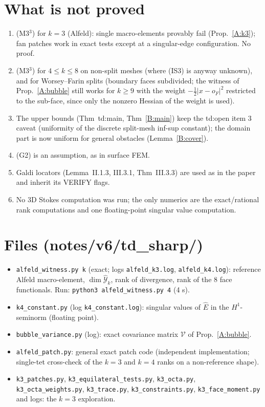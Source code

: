 \documentclass[11pt]{article}
\theoremstyle{definition}
\begin{document}
\section{What is not proved}
\begin{enumerate}
\item (M3$^3$) for $k=3$ (Alfeld): single macro-elements provably fail (Prop.~\ref{A:k3}); fan patches work in exact tests except at a singular-edge configuration. No proof.
\item (M3$^3$) for $4\le k\le8$ on non-split meshes (where (IS3) is anyway unknown), and for Worsey--Farin splits (boundary faces subdivided; the witness of Prop.~\ref{A:bubble} still works for $k\ge9$ with the weight $-\frac12|x-o_F|^2$ restricted to the sub-face, since only the nonzero Hessian of the weight is used).
\item The upper bounds (Thm~td:main, Thm~\ref{B:main}) keep the td:open item 3 caveat (uniformity of the discrete split-mesh inf-sup constant); the domain part is now uniform for general obstacles (Lemma~\ref{B:cover}).
\item (G2) is an assumption, as in surface FEM.
\item Galdi locators (Lemma~II.1.3, III.3.1, Thm~III.3.3) are used as in the paper and inherit its VERIFY flags.
\item No 3D Stokes computation was run; the only numerics are the exact/rational rank computations and one floating-point singular value computation.
\end{enumerate}

\section*{Files (notes/v6/td\_sharp/)}
\begin{itemize}
\item \texttt{alfeld\_witness.py k} (exact; logs \texttt{alfeld\_k3.log}, \texttt{alfeld\_k4.log}): reference Alfeld macro-element, $\dim\hat{\mathcal Y}_k$, rank of divergence, rank of the $8$ face functionals. Run: \texttt{python3 alfeld\_witness.py 4} (4 s).
\item \texttt{k4\_constant.py} (log \texttt{k4\_constant.log}): singular values of $\hat E$ in the $H^1$-seminorm (floating point).
\item \texttt{bubble\_variance.py} (log): exact covariance matrix $\mathcal V$ of Prop.~\ref{A:bubble}.
\item \texttt{alfeld\_patch.py}: general exact patch code (independent implementation; single-tet cross-check of the $k=3$ and $k=4$ ranks on a non-reference shape).
\item \texttt{k3\_patches.py}, \texttt{k3\_equilateral\_tests.py}, \texttt{k3\_octa.py}, \texttt{k3\_octa\_weights.py}, \texttt{k3\_trace.py}, \texttt{k3\_constraints.py}, \texttt{k3\_face\_moment.py} and logs: the $k=3$ exploration.
\end{itemize}
\end{document}
